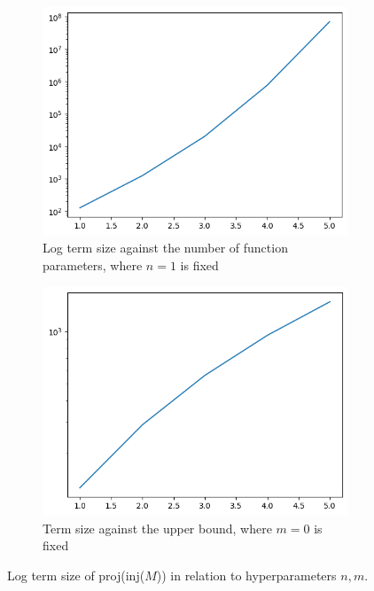 \documentclass[12pt,a4paper]{report}
\theoremstyle{definition}
\theoremstyle{definition}
\theoremstyle{remark}
\begin{document}
\begin{figure}
\centering
\begin{subfigure}{0.45\textwidth}
  \centering
  \includegraphics[width=\textwidth]{media/affine_term_size_against_type_order.png}
  \caption{Log term size against the number of function parameters, where $n=1$ is fixed}
\end{subfigure}%
\hfill
\begin{subfigure}{0.45\textwidth}
  \centering
  \includegraphics[width=\textwidth]{media/affine_term_size_against_upper_bound.png}
  \caption{Term size against the upper bound, where $m=0$ is fixed}
\end{subfigure}
\caption{Log term size of proj(inj($M$)) in relation to hyperparameters $n,m$.}
\label{fig:affine-term-size}
\end{figure}
\end{document}
